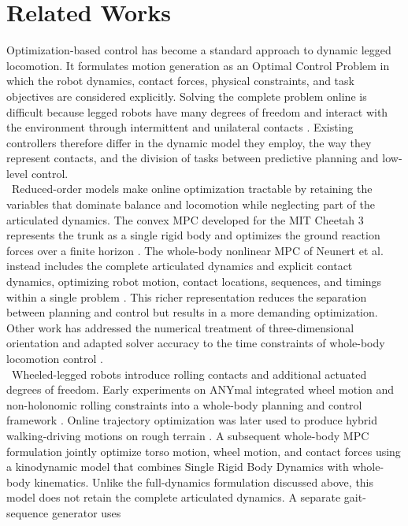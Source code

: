 \section{Related Works}
\label{sec:related_works}

Optimization-based control has become a standard approach to dynamic legged
locomotion. It formulates motion generation as an Optimal Control Problem in
which the robot dynamics, contact forces, physical constraints, and task
objectives are considered explicitly. Solving the complete problem online is
difficult because legged robots have many degrees of freedom and interact with
the environment through intermittent and unilateral contacts
\cite{legged_optimization}. Existing controllers therefore differ in the
dynamic model they employ, the way they represent contacts, and the division of
tasks between predictive planning and low-level control.\\
\
Reduced-order models make online optimization tractable by retaining the
variables that dominate balance and locomotion while neglecting part of the
articulated dynamics. The convex MPC developed for the MIT Cheetah 3 represents
the trunk as a single rigid body and optimizes the ground reaction forces over
a finite horizon \cite{cheetah_mpc}. The whole-body nonlinear MPC of Neunert
et al. instead includes the complete articulated dynamics and explicit contact
dynamics, optimizing robot motion,
contact locations, sequences, and timings within a single problem
\cite{whole_body_nmpc}. This richer representation
reduces the separation between planning and control but results in a more
demanding optimization. Other work has addressed the numerical treatment of
three-dimensional orientation \cite{representation_free_mpc} and adapted solver
accuracy to the time constraints of whole-body locomotion control
\cite{fast_whole_body_mpc}.\\
\
Wheeled-legged robots introduce rolling contacts and additional actuated
degrees of freedom. Early experiments on ANYmal integrated wheel motion and
non-holonomic rolling constraints into a whole-body planning and control
framework \cite{keep_rollin}. Online trajectory optimization was later used to
produce hybrid walking-driving motions on rough terrain
\cite{rolling_deep}. A subsequent whole-body MPC formulation jointly optimize
torso motion, wheel motion, and contact forces using a kinodynamic model that
combines Single Rigid Body Dynamics with whole-body kinematics. Unlike the
full-dynamics formulation discussed above, this model does not retain the
complete articulated dynamics. A separate gait-sequence generator uses
